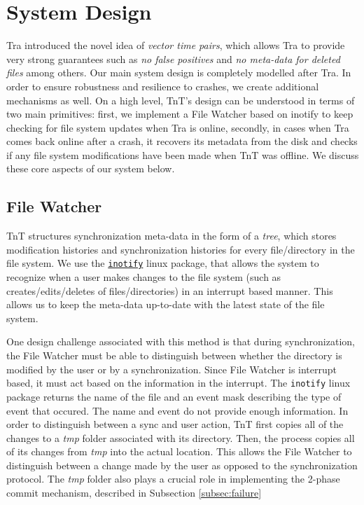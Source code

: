 \section{System Design}

Tra introduced the novel idea of {\em vector time pairs}, which allows Tra to provide very strong guarantees such as {\em no false positives} and {\em no meta-data for deleted files} among others. Our main system design is completely modelled after Tra.  In order to ensure robustness and resilience to crashes, we create additional mechanisms as well. On a high level, TnT's design can be understood in terms of two main primitives: first, we implement a File Watcher based on inotify to keep checking for file system updates when Tra is online, secondly, in cases when Tra comes back online after a crash, it recovers its metadata from the disk and checks if any file system modifications have been made when TnT was offline.  We discuss these core aspects of our system below.

\subsection{File Watcher}
TnT structures synchronization meta-data in the form of a {\em tree}, which stores modification histories and synchronization histories for every file/directory in the file system. We use the \href{http://godoc.org/code.google.com/p/go.exp/inotify}{\tt inotify} linux package, that allows the system to recognize when a user makes changes to the file system (such as creates/edits/deletes of files/directories) in an interrupt based manner. This allows us to keep the meta-data up-to-date with the latest state of the file system.

One design challenge associated with this method is that during synchronization, the File Watcher must be able to distinguish between whether the directory is modified by the user or by a synchronization.  Since File Watcher is interrupt based, it must act based on the information in the interrupt.  The {\tt inotify} linux package returns the name of the file and an event mask describing the type of event that occured.  The name and event do not provide enough information.  In order to distinguish between a sync and user action, TnT first copies all of the changes to a {\em tmp} folder associated with its directory.  Then, the process copies all of its changes from {\em tmp} into the actual location. This allows the File Watcher to distinguish between a change made by the user as opposed to the synchronization protocol. The {\em tmp} folder also plays a crucial role in implementing the 2-phase commit mechanism, described in Subsection \ref{subsec:failure}

